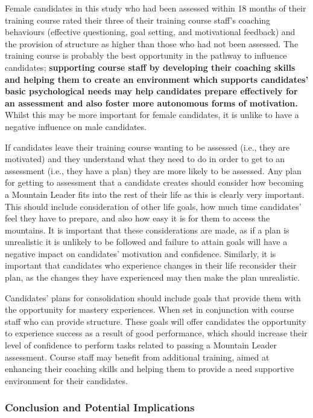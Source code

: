 \documentclass[
  12pt,
  a4paper,
]{book}
\begin{document}
Female candidates in this study who had been assessed within 18 months of their training course rated their three of their training course staff's coaching behaviours (effective questioning, goal setting, and motivational feedback) and the provision of structure as higher than those who had not been assessed. The training course is probably the best opportunity in the pathway to influence candidates; \textbf{supporting course staff by developing their coaching skills and helping them to create an environment which supports candidates' basic psychological needs may help candidates prepare effectively for an assessment and also foster more autonomous forms of motivation.} Whilst this may be more important for female candidates, it is unlike to have a negative influence on male candidates.

If candidates leave their training course wanting to be assessed (i.e., they are motivated) and they understand what they need to do in order to get to an assessment (i.e., they have a plan) they are more likely to be assessed. Any plan for getting to assessment that a candidate creates should consider how becoming a Mountain Leader fits into the rest of their life as this is clearly very important. This should include consideration of other life goals, how much time candidates' feel they have to prepare, and also how easy it is for them to access the mountains. It is important that these considerations are made, as if a plan is unrealistic it is unlikely to be followed and failure to attain goals will have a negative impact on candidates' motivation and confidence. Similarly, it is important that candidates who experience changes in their life reconsider their plan, as the changes they have experienced may then make the plan unrealistic.

Candidates' plans for consolidation should include goals that provide them with the opportunity for mastery experiences. When set in conjunction with course staff who can provide structure. These goals will offer candidates the opportunity to experience success as a result of good performance, which should increase their level of confidence to perform tasks related to passing a Mountain Leader assessment. Course staff may benefit from additional training, aimed at enhancing their coaching skills and helping them to provide a need supportive environment for their candidates.

\hypertarget{mts-part-b-conclusion-implications}{%
\subsubsection{Conclusion and Potential Implications}\label{mts-part-b-conclusion-implications}}
\end{document}

